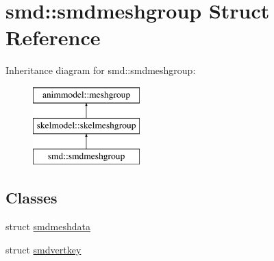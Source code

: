 \hypertarget{structsmd_1_1smdmeshgroup}{}\section{smd\+:\+:smdmeshgroup Struct Reference}
\label{structsmd_1_1smdmeshgroup}
Inheritance diagram for smd\+:\+:smdmeshgroup\+:\begin{figure}[H]
\begin{center}
\leavevmode
\includegraphics[height=3.000000cm]{structsmd_1_1smdmeshgroup}
\end{center}
\end{figure}
\subsection*{Classes}
\begin{DoxyCompactItemize}
\item 
struct \hyperlink{structsmd_1_1smdmeshgroup_1_1smdmeshdata}{smdmeshdata}
\item 
struct \hyperlink{structsmd_1_1smdmeshgroup_1_1smdvertkey}{smdvertkey}
\end{DoxyCompactItemize}
